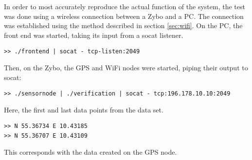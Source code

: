 In order to most accurately reproduce the actual function of the system, the test was done using a wireless connection between a Zybo and a PC.
The connection was established using the method described in section \ref{sec:wifi}.
On the PC, the front end was started, taking its input from a socat listener.
\begin{lstlisting}
>> ./frontend | socat - tcp-listen:2049
\end{lstlisting}
Then, on the Zybo, the GPS and WiFi nodes were started, piping their output to socat:
\begin{lstlisting}
>> ./sensornode | ./verification | socat - tcp:196.178.10.10:2049
\end{lstlisting}
Here, the first and last data points from the data set.
\begin{lstlisting}
>> N 55.36734 E 10.43185
>> N 55.36707 E 10.43109
\end{lstlisting}
This corresponds with the data created on the GPS node.
